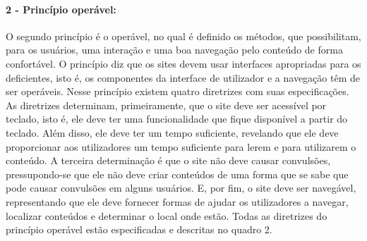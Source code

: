 \documentclass[a4paper]{article}
\begin{document}
\begin{titlepage}
\paragraph{2 - Princípio operável: }

O segundo princípio é o operável, no qual é definido os métodos, que possibilitam, para os usuários, uma interação e uma boa navegação pelo conteúdo de forma confortável. O princípio diz que os sites devem usar interfaces apropriadas para os deficientes, isto é, os componentes da interface de utilizador e a navegação têm de ser operáveis. Nesse princípio existem quatro diretrizes com suas especificações. As diretrizes determinam, primeiramente, que o site deve ser acessível por teclado, isto é, ele deve ter uma funcionalidade que fique disponível a partir do teclado. Além disso, ele deve ter um tempo suficiente, revelando que ele deve proporcionar aos utilizadores um tempo suficiente para lerem e para utilizarem o conteúdo. A terceira determinação é que o site não deve causar convulsões, pressupondo-se que ele não deve criar conteúdos de uma forma que se sabe que pode causar convulsões em alguns usuários. E, por fim, o site deve ser navegável, representando que ele deve fornecer formas de ajudar os utilizadores a navegar, localizar conteúdos e determinar o local onde estão. Todas as diretrizes do princípio operável estão especificadas e descritas no quadro 2.


\end{titlepage}
\end{document}
